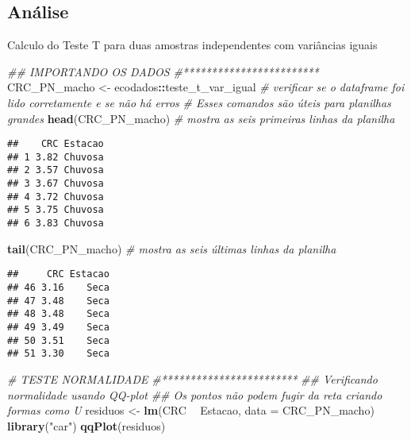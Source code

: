 \documentclass[
]{book}
\newenvironment{Shaded}{\begin{snugshade}}{\end{snugshade}}
\newcommand{\CommentTok}[1]{\textcolor[rgb]{0.56,0.35,0.01}{\textit{#1}}}
\newcommand{\DataTypeTok}[1]{\textcolor[rgb]{0.13,0.29,0.53}{#1}}
\newcommand{\KeywordTok}[1]{\textcolor[rgb]{0.13,0.29,0.53}{\textbf{#1}}}
\newcommand{\NormalTok}[1]{#1}
\newcommand{\OperatorTok}[1]{\textcolor[rgb]{0.81,0.36,0.00}{\textbf{#1}}}
\newcommand{\StringTok}[1]{\textcolor[rgb]{0.31,0.60,0.02}{#1}}
\begin{document}
\hypertarget{anuxe1lise}{%
\subsection{Análise}\label{anuxe1lise}}

Calculo do Teste T para duas amostras independentes com variâncias iguais

\begin{Shaded}
\begin{Highlighting}[]
\CommentTok{## IMPORTANDO OS DADOS}
\CommentTok{#************************}
\NormalTok{CRC_PN_macho <-}\StringTok{ }\NormalTok{ecodados}\OperatorTok{::}\NormalTok{teste_t_var_igual}
\CommentTok{# verificar se o dataframe foi lido corretamente e se não há erros}
\CommentTok{# Esses comandos são úteis para planilhas grandes}
\KeywordTok{head}\NormalTok{(CRC_PN_macho) }\CommentTok{# mostra as seis primeiras linhas da planilha}
\end{Highlighting}
\end{Shaded}

\begin{verbatim}
##    CRC Estacao
## 1 3.82 Chuvosa
## 2 3.57 Chuvosa
## 3 3.67 Chuvosa
## 4 3.72 Chuvosa
## 5 3.75 Chuvosa
## 6 3.83 Chuvosa
\end{verbatim}

\begin{Shaded}
\begin{Highlighting}[]
\KeywordTok{tail}\NormalTok{(CRC_PN_macho) }\CommentTok{# mostra as seis últimas linhas da planilha}
\end{Highlighting}
\end{Shaded}

\begin{verbatim}
##     CRC Estacao
## 46 3.16    Seca
## 47 3.48    Seca
## 48 3.48    Seca
## 49 3.49    Seca
## 50 3.51    Seca
## 51 3.30    Seca
\end{verbatim}

\begin{Shaded}
\begin{Highlighting}[]
\CommentTok{# TESTE NORMALIDADE}
\CommentTok{#************************}
\CommentTok{## Verificando normalidade usando QQ-plot}
\CommentTok{## Os pontos não podem fugir da reta criando formas como U}
\NormalTok{residuos <-}\StringTok{ }\KeywordTok{lm}\NormalTok{(CRC }\OperatorTok{~}\StringTok{ }\NormalTok{Estacao, }\DataTypeTok{data =}\NormalTok{ CRC_PN_macho)}
\KeywordTok{library}\NormalTok{(}\StringTok{"car"}\NormalTok{)}
\KeywordTok{qqPlot}\NormalTok{(residuos)}
\end{Highlighting}
\end{Shaded}
\end{document}

